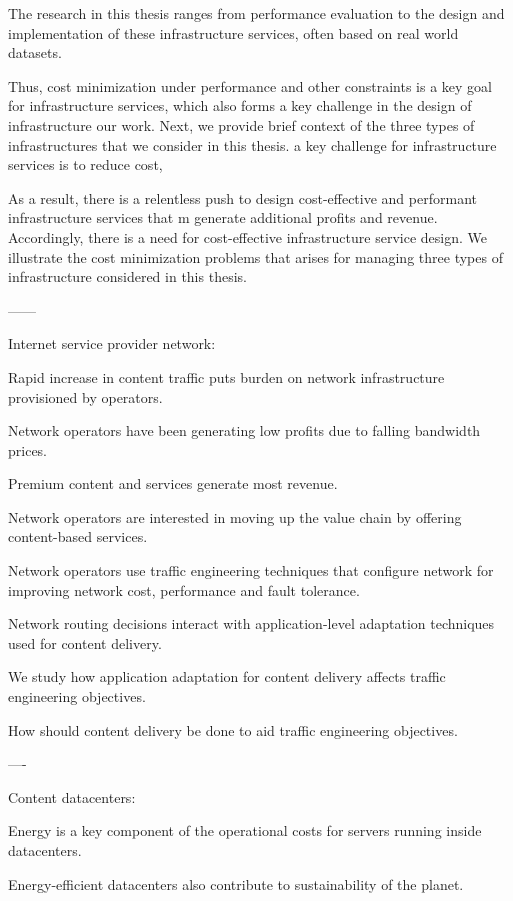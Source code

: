 The research in this thesis ranges from performance evaluation to the design and implementation of these infrastructure services, often based on real world datasets.



Thus, cost minimization under performance and other constraints is a key goal for infrastructure services, which also 
forms a key challenge in the design of infrastructure our work. Next, we provide brief context of the three types of infrastructures that we consider in this thesis.
 a key challenge for infrastructure services is to reduce cost, 

As a result, there is a relentless push to design cost-effective and performant infrastructure services that m
generate additional profits and revenue. 
Accordingly, there is a need for cost-effective infrastructure service design. 
We illustrate the cost minimization problems that arises for managing three types of infrastructure considered in this thesis. 

------

Internet service provider network:

Rapid increase in content traffic puts burden on network infrastructure provisioned by operators.

Network operators have been generating low profits due to falling bandwidth prices.

Premium content and services generate most revenue.

Network operators are interested in moving up the value chain by offering content-based services.

Network operators use traffic engineering techniques that configure network for improving network cost, performance and fault tolerance.

Network routing decisions interact with application-level adaptation techniques used for content delivery.

We study how application adaptation for content delivery affects traffic engineering objectives.

How should content delivery be done to aid traffic engineering objectives.

----

Content datacenters:

Energy is a key component of the operational costs for servers running inside datacenters.

Energy-efficient datacenters also contribute to sustainability of the planet.

